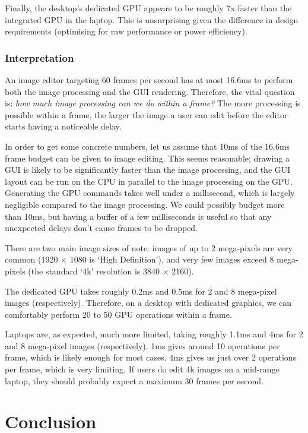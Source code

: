 \documentclass[12pt]{article}
\begin{document}
Finally, the desktop's dedicated GPU appears to be roughly 7x faster than the integrated GPU in the
laptop.  This is unsurprising given the difference in design requirements (optimising for raw
performance or power efficiency).

\subsubsection{Interpretation}

An image editor targeting 60 frames per second has at most 16.6ms to perform both the image
processing and the GUI rendering.  Therefore, the vital question is: \emph{how much image processing
can we do within a frame?}  The more processing is possible within a frame, the larger the image a
user can edit before the editor starts having a noticeable delay.

In order to get some concrete numbers, let us assume that 10ms of the 16.6ms frame budget can be
given to image editing.  This seems reasonable; drawing a GUI is likely to be significantly faster
than the image processing, and the GUI layout can be run on the CPU in parallel to the image
processing on the GPU.  Generating the GPU commands takes well under a millisecond, which is largely
negligible compared to the image processing.  We could possibly budget more than 10ms, but having a
buffer of a few milliseconds is useful so that any unexpected delays don't cause frames to be
dropped.

There are two main image sizes of note: images of up to 2 mega-pixels are very common (1920
$\times$ 1080 is `High Definition'), and very few images exceed 8 mega-pixels (the standard `4k'
resolution is 3840 $\times$ 2160).

The dedicated GPU takes roughly 0.2ms and 0.5ms for 2 and 8 mega-pixel images (respectively).
Therefore, on a desktop with dedicated graphics, we can comfortably perform 20 to 50 GPU operations
within a frame.

Laptops are, as expected, much more limited, taking roughly 1.1ms and 4ms for 2 and 8 mega-pixel
images (respectively).  1ms gives around 10 operations per frame, which is likely enough for most
cases.  4ms gives us just over 2 operations per frame, which is very limiting.  If users do edit 4k
images on a mid-range laptop, they should probably expect a maximum 30 frames per second.



\pagebreak

\section{Conclusion}\label{sec:conclusion}
\end{document}
